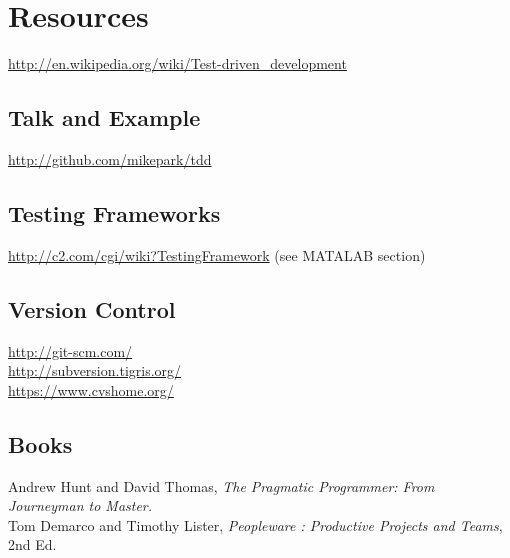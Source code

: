 \documentclass[twocolumn]{article}
\begin{document}
  \section{Resources}

  \url{http://en.wikipedia.org/wiki/Test-driven_development}

  \subsection{Talk and Example}  
  \url{http://github.com/mikepark/tdd}

  \subsection{Testing Frameworks}  
  \url{http://c2.com/cgi/wiki?TestingFramework} (see MATALAB section)

  \subsection{Version Control}
  \url{http://git-scm.com/} \\
  \url{http://subversion.tigris.org/}\\
  \url{https://www.cvshome.org/}\

  \subsection{Books}
 Andrew Hunt and David Thomas,
 \textit{The Pragmatic Programmer: From Journeyman to Master.}\\
Tom Demarco and Timothy Lister,
\textit{Peopleware : Productive Projects and Teams}, 2nd Ed.
  
\end{document}
